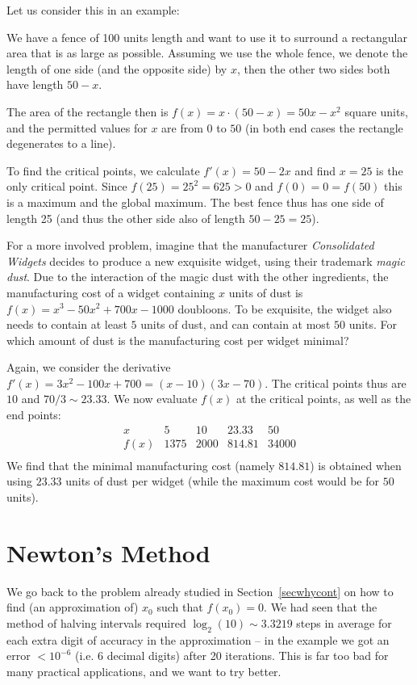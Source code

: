 Let us consider this in an example:

We have a fence of 100 units length and want to use it to surround a
rectangular area that is as large as possible. Assuming we use the whole
fence, we denote the length of one side (and the opposite side) by $x$, then
the other two sides
both have length $50-x$.

The area of the rectangle then is $f(x)=x\cdot(50-x)=50x-x^2$ square units,
and the permitted values for $x$ are from $0$ to $50$ (in both end cases the
rectangle degenerates to a line).
\smallskip

To find the critical points, we calculate $f'(x)=50-2x$ and find $x=25$ is
the only critical point. Since $f(25)=25^2=625>0$ and $f(0)=0=f(50)$ this is
a maximum and the global maximum. The best fence thus has one side of length
25 (and thus the other side also of length $50-25=25$).
\medskip

For a more involved problem, imagine that the manufacturer {\em Consolidated
Widgets} decides to produce a new exquisite widget, using their trademark
{\em magic dust}. Due to the interaction of the magic dust with the other
ingredients, the manufacturing cost of a widget containing $x$ units of dust
is $f(x)=x^3-50x^2+700x-1000$ doubloons. To be exquisite, the widget also needs
to contain at least $5$ units of dust, and can contain at most $50$ units.
For which amount of dust is the
manufacturing cost per widget minimal?

Again, we consider the derivative $f'(x)=3x^2-100x+700=(x-10)(3x-70)$. The
critical points thus are $10$ and $70/3\sim 23.33$. We now evaluate $f(x)$
at the critical points, as well as the end points:
\[
\begin{array}{c|r|r|r|r}
x&5&10&23.33&50\\
\hline
f(x)&1375&2000&814.81&34000\\
\end{array}
\]
We find that the minimal manufacturing cost (namely $814.81$) is obtained when using $23.33$
units of dust per widget (while the maximum cost would be for $50$ units).

\section{Newton's Method}
\label{secnewton}

We go back to the problem already studied in Section~\ref{secwhycont} on how
to find (an approximation of) $x_0$ such that $f(x_0)=0$.
We had seen that the method of halving intervals required $\log_2(10)\sim
3.3219$ steps in average for each extra digit of accuracy in the
approximation -- in the example we got an error $<10^{-6}$ (i.e. $6$ decimal
digits) after 20 iterations.
This is far too bad for many practical applications, and we want to try
better.

